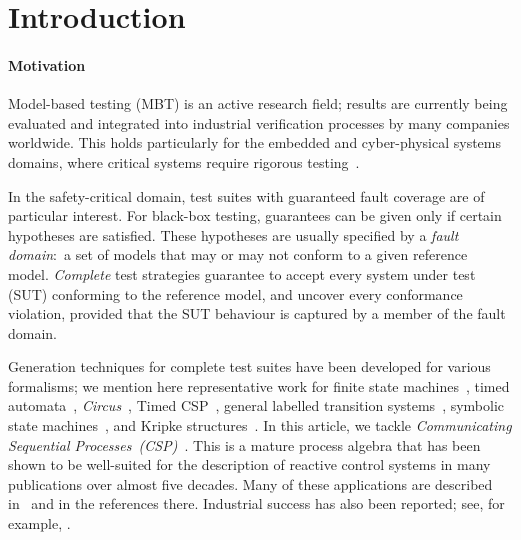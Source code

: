 \documentclass[3p,times]{elsarticle}
\begin{document}


\section{Introduction}
\label{sec:intro}


\paragraph{Motivation}
Model-based testing (MBT) is an active research field; results are currently
being evaluated and integrated into industrial verification processes by many
companies worldwide. This holds particularly for the embedded and
cyber-physical systems domains, where critical systems require rigorous
testing~\cite{jp2018ets,DBLP:conf/isola/0001BH18}.

In the safety-critical domain, test suites with guaranteed fault coverage are
of particular interest. For black-box testing, guarantees can be given only
if certain hypotheses are satisfied. These hypotheses are usually specified
by a \emph{fault domain}:~a set of models that may or may not conform to a
given reference model. \emph{Complete} test strategies guarantee to accept
every  system under test (SUT) conforming to the reference model, and uncover
every conformance violation, provided that the SUT behaviour is captured by a
member of the fault domain.

Generation techniques for complete test suites have been developed for
various formalisms; we mention here representative work for finite state
machines~\cite{hierons_testing_2004,simao_reducing_2012}, timed
automata~\cite{Springintveld2001}, {\sf\em
Circus}~\cite{DBLP:journals/acta/CavalcantiG11}, Timed
CSP~\cite{Schneider:1995:OST:203471.203475}, general labelled transition
systems~\cite{DBLP:journals/cn/Tretmans96}, symbolic state
machines~\cite{DBLP:conf/icst/Petrenko16}, and Kripke
structures~\cite{Huang2017}. In this article, we tackle \emph{Communicating
Sequential Processes~(CSP)}~\cite{Hoare:1985:CSP:3921,Roscoe2010}. This is a
mature process algebra that has been shown to be well-suited for the
description of reactive control systems in many publications over almost five
decades. Many of these applications are described in~\cite{Roscoe2010} and in
the references there. Industrial success has also been reported; see, for
example, \cite{976937,DBLP:conf/prdc/ShiPK99,DBLP:conf/amast/ButhKPS97}.
\end{document}
